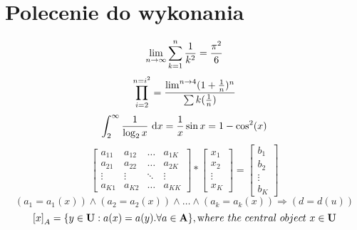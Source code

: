 \documentclass[a4paper,12pt]{article}
\begin{document}
\section{Polecenie do wykonania}
\begin{equation}
\lim_{n\rightarrow \infty} \sum_{k=1}^n \frac{1}{k^2}=\frac{\pi^2}{6}\\
\end{equation}
\newline
\begin{equation}
\prod^{n=i^2}_{i=2}=\frac{\lim^{n \rightarrow 4}(1+\frac{1}{n})^n}{\sum k (\frac{1}{n})}\\
\end{equation}
\newline
\begin{equation}
\int^{\infty}_2 \frac{1}{\log_{2}x}\ \mathrm{d}x = \frac{1}{x} \sin{x}=1-\cos^2(x)\\
\end{equation}
\newline
\begin{equation}
\left[ \begin{array}{cccc}
a_{11} & a_{12} & \ldots & a_{1K}\\
a_{21} & a_{22} & \ldots & a_{2K}\\
\vdots & \vdots & \ddots & \vdots\\
a_{K1} & a_{K2} & \ldots & a_{KK}
\end{array} \right ] \ast
\left[ \begin{array}{c}
x_1\\
x_2\\
\vdots\\
x_K
\end{array} \right ]=
\left [ \begin{array}{c}
b_1\\
b_2\\
\vdots\\
b_K
\end{array} \right ]
\end{equation}
\newline
\begin{equation}
(a_1=a_1(x)) \wedge (a_2=a_2(x)) \wedge \ldots \wedge(a_k=a_k(x)) \Rightarrow (d=d(u))
\end{equation}
\newline
\begin{equation}
\left[x\right ]_A=\{y \in\mathbf U : a(x)=a(y).\forall a \in \mathbf A\}, {\textrm where\ the\ central\ object}\ x \in \mathbf U
\end{equation}
\end{document}
